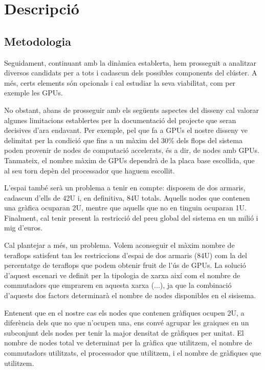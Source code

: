 \section{Descripció}

\subsection{Metodologia}
Seguidament, continuant amb la dinàmica establerta, hem prosseguit a analitzar diversos candidats per a tots i cadascun dels possibles components del clúster. A més, certs elements són opcionals i cal estudiar la seva viabilitat, com per exemple les GPUs. 

No obstant, abans de prosseguir amb els següents aspectes del disseny cal valorar algunes limitacions establertes per la documentació del projecte que seran decisives d'ara endavant. Per exemple, pel que fa a GPUs el nostre disseny ve delimitat per la condició que fins a un màxim del 30\% dels flops del sistema poden provenir de nodes de computació accelerats, és a dir, de nodes amb GPUs. Tanmateix, el nombre màxim de GPUs dependrà de la placa base escollida, que al seu torn depèn del processador que haguem escollit. 

L'espai també serà un problema a tenir en compte: disposem de dos armaris, cadascun d'ells de 42U i, en definitiva, 84U totals. Aquells nodes que contenen una gràfica ocuparan 2U, mentre que aquells que no en tinguin ocuparan 1U. Finalment, cal tenir present la restricció del preu global del sistema en un milió i mig d'euros. 


Cal plantejar a més, un problema. Volem aconseguir el màxim nombre de teraflops satisfent tan les restriccions d'espai de dos armaris (84U) com la del percentatge de teraflops que podem obtenir fruit de l'ús de GPUs. La solució d'aquest escenari ve definit per la tipologia de xarxa així com el nombre de commutadors que emprarem en aquesta xarxa (...), ja que la combinació d'aquests dos factors determinarà el nombre de nodes disponibles en el sisisema.

Entenent que en el nostre cas els nodes que contenen gràfiques ocupen 2U, a diferència dels que no que n'ocupen una, ens convé agrupar les graiques en un subconjunt dels nodes per tenir la major densitat de gràfiques per unitat. El nombre de nodes total ve determinat per la gràfica que utilitzem, el nombre de commutadors utilitzats, el processador que utilitzem, i el nombre de gràfiques que utilitzem. 

